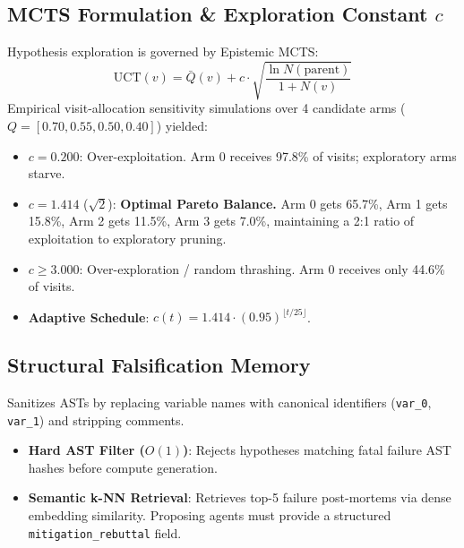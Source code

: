 \documentclass[11pt,a4paper]{article}
\begin{document}
\subsection{MCTS Formulation \& Exploration Constant $c$}
Hypothesis exploration is governed by Epistemic MCTS:
\begin{equation}
    \text{UCT}(v) = \bar{Q}(v) + c \cdot \sqrt{\frac{\ln N(\text{parent})}{1 + N(v)}}
\end{equation}
Empirical visit-allocation sensitivity simulations over 4 candidate arms ($Q = [0.70, 0.55, 0.50, 0.40]$) yielded:
\begin{itemize}[noitemsep]
    \item $c = 0.200$: Over-exploitation. Arm 0 receives 97.8\% of visits; exploratory arms starve.
    \item $c = 1.414$ ($\sqrt{2}$): \textbf{Optimal Pareto Balance.} Arm 0 gets 65.7\%, Arm 1 gets 15.8\%, Arm 2 gets 11.5\%, Arm 3 gets 7.0\%, maintaining a 2:1 ratio of exploitation to exploratory pruning.
    \item $c \ge 3.000$: Over-exploration / random thrashing. Arm 0 receives only 44.6\% of visits.
    \item \textbf{Adaptive Schedule}: $c(t) = 1.414 \cdot (0.95)^{\lfloor t / 25 \rfloor}$.
\end{itemize}

\subsection{Structural Falsification Memory}
Sanitizes ASTs by replacing variable names with canonical identifiers (\texttt{var\_0}, \texttt{var\_1}) and stripping comments.
\begin{itemize}[noitemsep]
    \item \textbf{Hard AST Filter ($O(1)$)}: Rejects hypotheses matching fatal failure AST hashes before compute generation.
    \item \textbf{Semantic k-NN Retrieval}: Retrieves top-5 failure post-mortems via dense embedding similarity. Proposing agents must provide a structured \texttt{mitigation\_rebuttal} field.
\end{itemize}
\end{document}
